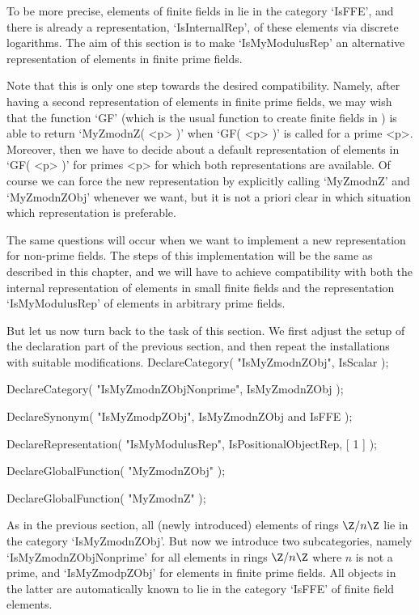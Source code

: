 To be more precise,
elements of finite fields in {\GAP} lie in the category `IsFFE',
and there is already a representation, `IsInternalRep', of these elements
via discrete logarithms.
The aim of this section is to make `IsMyModulusRep' an alternative
representation of elements in finite prime fields.

Note that this is only one step towards the desired compatibility.
Namely, after having a second representation of elements in finite
prime fields, we may wish that the function `GF' (which is the usual
function to create finite fields in {\GAP}) is able to return
`MyZmodnZ( <p> )' when `GF( <p> )' is called for a prime <p>.
Moreover, then we have to decide about a default representation of
elements in `GF( <p> )' for primes <p> for which both representations are
available.
Of course we can force the new representation by explicitly calling
`MyZmodnZ' and `MyZmodnZObj' whenever we want, but it is not a priori
clear in which situation which representation is preferable.

The same questions will occur when we want to implement a new
representation for non-prime fields.
The steps of this implementation will be the same as described in this
chapter,
and we will have to achieve compatibility with both the internal
representation of elements in small finite fields and the representation
`IsMyModulusRep' of elements in arbitrary prime fields.

But let us now turn back to the task of this section.
We first adjust the setup of the declaration part of the previous section,
and then repeat the installations with suitable modifications.
\begintt
DeclareCategory( "IsMyZmodnZObj", IsScalar );

DeclareCategory( "IsMyZmodnZObjNonprime", IsMyZmodnZObj );

DeclareSynonym( "IsMyZmodpZObj", IsMyZmodnZObj and IsFFE );

DeclareRepresentation( "IsMyModulusRep", IsPositionalObjectRep, [ 1 ] );

DeclareGlobalFunction( "MyZmodnZObj" );

DeclareGlobalFunction( "MyZmodnZ" );
\endtt

As in the previous section,
all (newly introduced) elements of rings $\Z/n\Z$ lie in the category
`IsMyZmodnZObj'.
But now we introduce two subcategories, namely `IsMyZmodnZObjNonprime'
for all elements in rings $\Z/n\Z$ where $n$ is not a prime,
and `IsMyZmodpZObj' for elements in finite prime fields.
All objects in the latter are automatically known to lie in the
category `IsFFE' of finite field elements.

